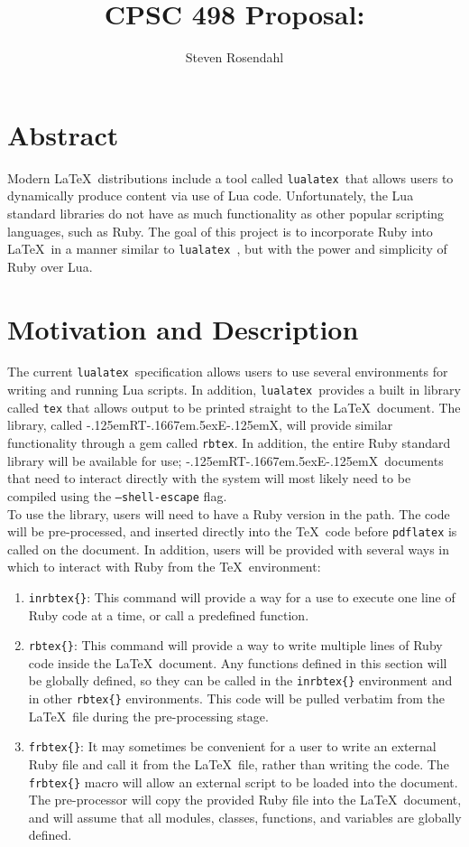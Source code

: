 \documentclass{article}
\title{CPSC 498 Proposal: \RbTeX}
\author{Steven Rosendahl}
\date{}
\newcommand{\inlinecode}[1]{\texttt{#1}}
\newcommand{\luatex}{\inlinecode{lualatex}\ }
\newcommand{\findent}{\leavevmode{\parindent=1.3em\indent}}
\def\RbTeX{{\rm\kern-.125emR\!{\scalebox{0.7}{\lower-.5ex\hbox{B}}}\!T\kern-.1667em\lower.5ex\hbox{E}\kern-.125emX}}
\begin{document}
\maketitle
\section{Abstract}

\findent Modern \LaTeX\ distributions include a tool called \luatex that allows users to dynamically
produce content via use of Lua code. Unfortunately, the Lua standard libraries do not have as much
functionality as other popular scripting languages, such as Ruby. The goal of this project is to
incorporate Ruby into \LaTeX\ in a manner similar to \luatex, but with the power and
simplicity of Ruby over Lua.

\section{Motivation and Description}

\findent The current \luatex specification allows users to use several environments for writing and
running Lua scripts. In addition, \luatex provides a built in library called \inlinecode{tex} that allows
output to be printed straight to the \LaTeX\ document. The library, called \RbTeX, will provide similar
functionality through a gem called \inlinecode{rbtex}. In addition, the entire Ruby standard library will
be available for use; \RbTeX\ documents that need to interact directly with the system will most likely
need to be compiled using the \inlinecode{--shell-escape} flag.\\

To use the library, users will need to have a Ruby version in the path. The code will be pre-processed,
and inserted directly into the \TeX\ code before \inlinecode{pdflatex} is called on the document. In
addition, users will be provided with several ways in which to interact with Ruby from the \TeX\
environment:

\begin{enumerate}
\item \inlinecode{inrbtex\{\}}: This command will provide a way for a use to execute one line of Ruby
code at a time, or call a predefined function.
\item \inlinecode{rbtex\{\}}: This command will provide a way to write multiple lines of Ruby code inside
the \LaTeX\ document. Any functions defined in this section will be globally defined, so they can be
called in the \inlinecode{inrbtex\{\}} environment and in other \inlinecode{rbtex\{\}} environments. This
code will be pulled verbatim from the \LaTeX\ file during the pre-processing stage.
\item \inlinecode{frbtex\{\}}: It may sometimes be convenient for a user to write an external Ruby file
and call it from the \LaTeX\ file, rather than writing the code. The \inlinecode{frbtex\{\}} macro will
allow an external script to be loaded into the document. The pre-processor will copy the provided Ruby
file into the \LaTeX\ document, and will assume that all modules, classes, functions, and variables are
globally defined.
\end{enumerate}
\end{document}
